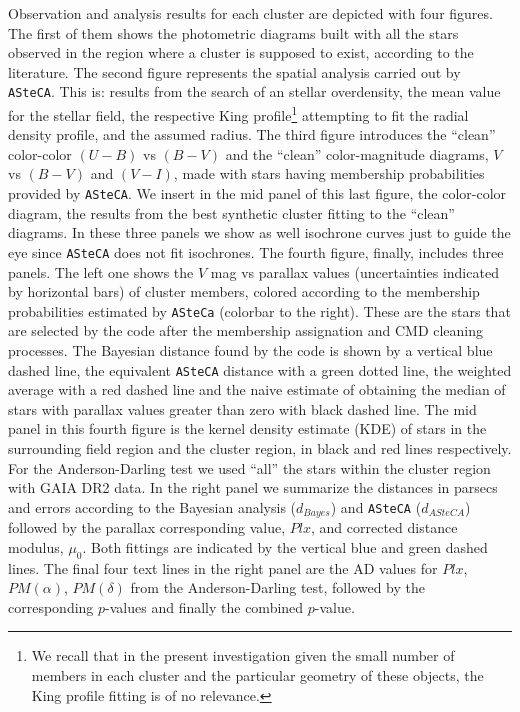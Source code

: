 \documentclass{aa}
\begin{document}
Observation and analysis results for each cluster are depicted
with four figures. The first of them shows the photometric diagrams built with
all the stars observed in the region where a cluster is supposed to exist,
according to the literature.
The second figure represents the spatial analysis carried out by
\texttt{ASteCA}. This is: results from the search of an stellar overdensity, the
mean value for the stellar field, the respective King profile\footnote{We
recall that in the present investigation given the small number of members in
each cluster and the particular geometry of these objects, the King profile
fitting is of no relevance.} attempting to fit the radial density profile, and
the assumed radius.
The third figure introduces the ``clean'' color-color $(U-B)$ vs $(B-V)$ and the
``clean'' color-magnitude diagrams, $V$ vs $(B-V)$ and $(V-I)$, made with stars
having membership probabilities provided by \texttt{ASteCA}. We insert in the
mid panel of this last figure, the color-color diagram, the results from the
best synthetic cluster fitting to the ``clean'' diagrams. In these three panels
we show as well isochrone curves just to guide the eye since \texttt{ASteCA}
does not fit isochrones.
%
The fourth figure, finally, includes three panels. The left one shows the
$V$ mag vs parallax values (uncertainties indicated by horizontal bars) of
cluster members, colored according to the membership probabilities
estimated by \texttt{ASteCa} (colorbar to the right). These are the stars that
are selected by the code after the membership assignation and CMD cleaning
processes.
%
The Bayesian distance found by the code is shown by a vertical blue dashed line,
the equivalent \texttt{ASteCA} distance with a green dotted line, the weighted
average with a red dashed line and the naive estimate of obtaining the median of
stars with parallax values greater than zero with black dashed line.
%
The mid panel in this fourth figure is the kernel density estimate (KDE) of
stars in the surrounding field region and the cluster region, in black and red
lines respectively. For the Anderson-Darling test we used ``all'' the
stars within the cluster region with GAIA DR2 data. In the right panel we
summarize the distances in parsecs and errors according to the Bayesian analysis
($d_{Bayes}$) and \texttt{ASteCA} ($d_{ASteCA}$) followed by the parallax
corresponding value, $Plx$, and corrected distance modulus, $\mu_0$. Both
fittings are indicated by the vertical blue and green dashed lines. The final
four text lines in the right panel are the AD values for $Plx$, $PM(\alpha)$,
$PM(\delta)$ from the Anderson-Darling test, followed by the corresponding
$p$-values and finally the combined $p$-value.\\
\end{document}
